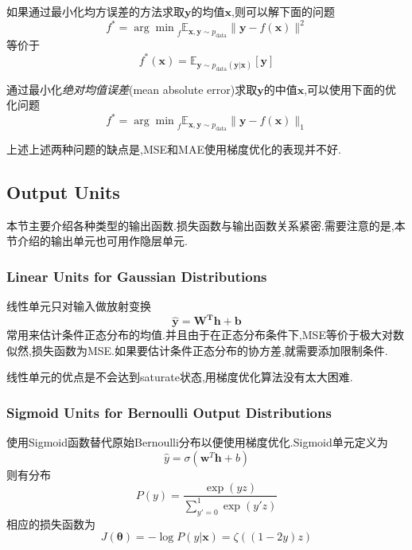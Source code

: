 如果通过最小化均方误差的方法求取$\bm y$的均值$\bm x$,则可以解下面的问题
\begin{equation}
f^\ast={\arg \min}_{f}\mathbb E_{\bm{x,y}\sim p_{\text{data}}}\|\bm y-f(\bm x)\|^2
\end{equation}
等价于
\begin{equation}
f^\ast(\bm x)=\mathbb E_{\bm y\sim p_{\text{data}}(\bm y|\bm x)}[\bm y]
\end{equation}

通过最小化\textit{绝对均值误差}(mean absolute error)求取$\bm y$的中值$\bm x$,可以使用下面的优化问题
\begin{equation}
f^\ast={\arg \min}_{f}\mathbb E_{\bm{x,y}\sim p_{\text{data}}}\|\bm y-f(\bm x)\|_1
\end{equation}

上述上述两种问题的缺点是,MSE和MAE使用梯度优化的表现并不好.

\subsection{Output Units}

本节主要介绍各种类型的输出函数.损失函数与输出函数关系紧密.需要注意的是,本节介绍的输出单元也可用作隐层单元.

\subsubsection{Linear Units for Gaussian Distributions}

线性单元只对输入做放射变换
\begin{equation}
\bm{\hat y=W^Th+b}
\end{equation}
常用来估计条件正态分布的均值.并且由于在正态分布条件下,MSE等价于极大对数似然,损失函数为MSE.如果要估计条件正态分布的协方差,就需要添加限制条件.

线性单元的优点是不会达到saturate状态,用梯度优化算法没有太大困难.

\subsubsection{Sigmoid Units for Bernoulli Output Distributions}

使用Sigmoid函数替代原始Bernoulli分布以便使用梯度优化.Sigmoid单元定义为
\begin{equation}
\hat y=\sigma(\bm w^T\bm h+b)
\end{equation}
则有分布
\begin{equation}
P(y)=\frac{\exp{(yz)}}{\sum_{y'=0}^1\exp(y'z)}
\end{equation}
相应的损失函数为
\begin{equation}
J({\bm\theta})=-\log P(y|\bm x)=\zeta((1-2y)z)
\end{equation}

